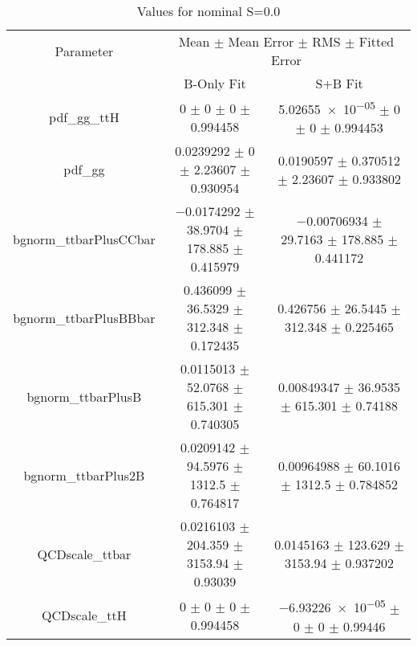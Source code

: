 \begin{table}
\centering
\caption{Values for nominal S=0.0}
\begin{tabular}{ccc}
\toprule
Parameter & \multicolumn{2}{c}{Mean $\pm$ Mean Error $\pm$ RMS $\pm$ Fitted Error}\\
 & B-Only Fit & S+B Fit\\
\midrule
pdf\_gg\_ttH & \num{0} $\pm$ \num{0} $\pm$ \num{0} $\pm$ \num{0.994458} & \num{5.02655e-05} $\pm$ \num{0} $\pm$ \num{0} $\pm$ \num{0.994453}\\
pdf\_gg & \num{0.0239292} $\pm$ \num{0} $\pm$ \num{2.23607} $\pm$ \num{0.930954} & \num{0.0190597} $\pm$ \num{0.370512} $\pm$ \num{2.23607} $\pm$ \num{0.933802}\\
bgnorm\_ttbarPlusCCbar & \num{-0.0174292} $\pm$ \num{38.9704} $\pm$ \num{178.885} $\pm$ \num{0.415979} & \num{-0.00706934} $\pm$ \num{29.7163} $\pm$ \num{178.885} $\pm$ \num{0.441172}\\
bgnorm\_ttbarPlusBBbar & \num{0.436099} $\pm$ \num{36.5329} $\pm$ \num{312.348} $\pm$ \num{0.172435} & \num{0.426756} $\pm$ \num{26.5445} $\pm$ \num{312.348} $\pm$ \num{0.225465}\\
bgnorm\_ttbarPlusB & \num{0.0115013} $\pm$ \num{52.0768} $\pm$ \num{615.301} $\pm$ \num{0.740305} & \num{0.00849347} $\pm$ \num{36.9535} $\pm$ \num{615.301} $\pm$ \num{0.74188}\\
bgnorm\_ttbarPlus2B & \num{0.0209142} $\pm$ \num{94.5976} $\pm$ \num{1312.5} $\pm$ \num{0.764817} & \num{0.00964988} $\pm$ \num{60.1016} $\pm$ \num{1312.5} $\pm$ \num{0.784852}\\
QCDscale\_ttbar & \num{0.0216103} $\pm$ \num{204.359} $\pm$ \num{3153.94} $\pm$ \num{0.93039} & \num{0.0145163} $\pm$ \num{123.629} $\pm$ \num{3153.94} $\pm$ \num{0.937202}\\
QCDscale\_ttH & \num{0} $\pm$ \num{0} $\pm$ \num{0} $\pm$ \num{0.994458} & \num{-6.93226e-05} $\pm$ \num{0} $\pm$ \num{0} $\pm$ \num{0.99446}\\
\bottomrule
\end{tabular}
\end{table}